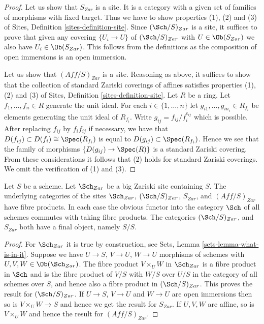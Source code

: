 \begin{proof}
Let us show that $S_{Zar}$ is a site. It is a category with a
given set of families of morphisms with fixed target. Thus we
have to show properties (1), (2) and (3) of
Sites, Definition \ref{sites-definition-site}.
Since $(\Sch/S)_{Zar}$ is a site, it suffices to prove
that given any covering $\{U_i \to U\}$ of $(\Sch/S)_{Zar}$
with $U \in \Ob(S_{Zar})$ we also have $U_i \in \Ob(S_{Zar})$.
This follows from the definitions
as the composition of open immersions is an open immersion.

\medskip\noindent
Let us show that $(\textit{Aff}/S)_{Zar}$ is a site.
Reasoning as above, it suffices to show that the collection
of standard Zariski coverings of affines satisfies properties
(1), (2) and (3) of
Sites, Definition \ref{sites-definition-site}.
Let $R$ be a ring. Let $f_1, \ldots, f_n \in R$ generate the unit ideal.
For each $i \in \{1, \ldots, n\}$ let $g_{i1}, \ldots, g_{in_i} \in R_{f_i}$
be elements generating the unit ideal of $R_{f_i}$. Write
$g_{ij} = f_{ij}/f_i^{e_{ij}}$ which is possible. After replacing
$f_{ij}$ by $f_i f_{ij}$ if necessary, we have that
$D(f_{ij}) \subset D(f_i) \cong \Spec(R_{f_i})$ is
equal to $D(g_{ij}) \subset \Spec(R_{f_i})$. Hence we see that
the family of morphisms $\{D(g_{ij}) \to \Spec(R)\}$
is a standard Zariski covering. From these considerations
it follows that (2) holds for standard Zariski coverings.
We omit the verification of (1) and (3).
\end{proof}

\begin{lemma}
\label{lemma-fibre-products-Zariski}
Let $S$ be a scheme. Let $\Sch_{Zar}$ be a big Zariski
site containing $S$. The underlying categories of the sites
$\Sch_{Zar}$, $(\Sch/S)_{Zar}$,
$S_{Zar}$, and $(\textit{Aff}/S)_{Zar}$ have fibre products.
In each case the obvious functor into the category $\Sch$ of
all schemes commutes with taking fibre products. The categories
$(\Sch/S)_{Zar}$, and $S_{Zar}$ both have a final object,
namely $S/S$.
\end{lemma}

\begin{proof}
For $\Sch_{Zar}$ it is true by construction, see
Sets, Lemma \ref{sets-lemma-what-is-in-it}.
Suppose we have $U \to S$, $V \to U$, $W \to U$ morphisms
of schemes with $U, V, W \in \Ob(\Sch_{Zar})$.
The fibre product $V \times_U W$ in $\Sch_{Zar}$
is a fibre product in $\Sch$ and
is the fibre product of $V/S$ with $W/S$ over $U/S$ in
the category of all schemes over $S$, and hence also a
fibre product in $(\Sch/S)_{Zar}$.
This proves the result for $(\Sch/S)_{Zar}$.
If $U \to S$, $V \to U$ and $W \to U$ are open immersions then so is
$V \times_U W \to S$ and hence we get the result for $S_{Zar}$.
If $U, V, W$ are affine, so is $V \times_U W$ and hence the
result for $(\textit{Aff}/S)_{Zar}$.
\end{proof}

